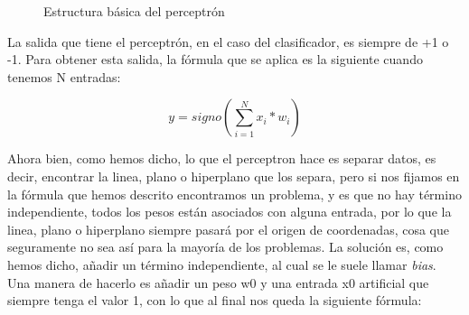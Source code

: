 \begin{figure}[h]
    \centering
    
    
    
    \caption{Estructura básica del perceptrón}
    \label{fig:perceptron}
\end{figure}

La salida que tiene el perceptrón, en el caso del clasificador, es siempre de +1 o -1. Para obtener esta salida, la fórmula que se aplica es la siguiente cuando tenemos N entradas:

\[y=signo(\sum_{i=1}^{N}x_{i}*w_{i})\]

Ahora bien, como hemos dicho, lo que el perceptron hace es separar datos, es decir, encontrar la linea, plano o hiperplano que los separa, pero si nos fijamos en la fórmula que hemos descrito encontramos un problema, y es que no hay término independiente, todos los pesos están asociados con alguna entrada, por lo que la linea, plano o hiperplano siempre pasará por el origen de coordenadas, cosa que seguramente no sea así para la mayoría de los problemas. La solución es, como hemos dicho, añadir un término independiente, al cual se le suele llamar \textit{bias}. Una manera de hacerlo es añadir un peso w0 y una entrada x0 artificial que siempre tenga el valor 1, con lo que al final nos queda la siguiente fórmula:


